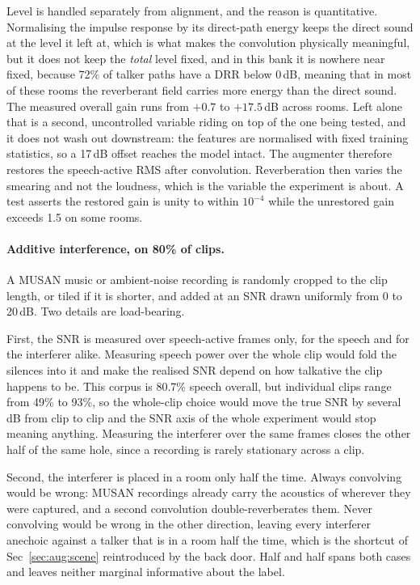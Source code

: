 \documentclass{article}
\begin{document}
Level is handled separately from alignment, and the reason is quantitative. Normalising the impulse response by its direct-path energy keeps the direct sound at the level it left at, which is what makes the convolution physically meaningful, but it does not keep the \emph{total} level fixed, and in this bank it is nowhere near fixed, because 72\% of talker paths have a DRR below 0\,dB, meaning that in most of these rooms the reverberant field carries more energy than the direct sound. The measured overall gain runs from $+0.7$ to $+17.5$\,dB across rooms. Left alone that is a second, uncontrolled variable riding on top of the one being tested, and it does not wash out downstream: the features are normalised with fixed training statistics, so a 17\,dB offset reaches the model intact. The augmenter therefore restores the speech-active RMS after convolution. Reverberation then varies the smearing and not the loudness, which is the variable the experiment is about. A test asserts the restored gain is unity to within $10^{-4}$ while the unrestored gain exceeds 1.5 on some rooms.

\paragraph{Additive interference, on 80\% of clips.} A MUSAN music or ambient-noise recording is randomly cropped to the clip length, or tiled if it is shorter, and added at an SNR drawn uniformly from 0 to 20\,dB. Two details are load-bearing.

First, the SNR is measured over speech-active frames only, for the speech and for the interferer alike. Measuring speech power over the whole clip would fold the silences into it and make the realised SNR depend on how talkative the clip happens to be. This corpus is 80.7\% speech overall, but individual clips range from 49\% to 93\%, so the whole-clip choice would move the true SNR by several dB from clip to clip and the SNR axis of the whole experiment would stop meaning anything. Measuring the interferer over the same frames closes the other half of the same hole, since a recording is rarely stationary across a clip.

Second, the interferer is placed in a room only half the time. Always convolving would be wrong: MUSAN recordings already carry the acoustics of wherever they were captured, and a second convolution double-reverberates them. Never convolving would be wrong in the other direction, leaving every interferer anechoic against a talker that is in a room half the time, which is the shortcut of Sec~\ref{sec:aug:scene} reintroduced by the back door. Half and half spans both cases and leaves neither marginal informative about the label.
\end{document}
